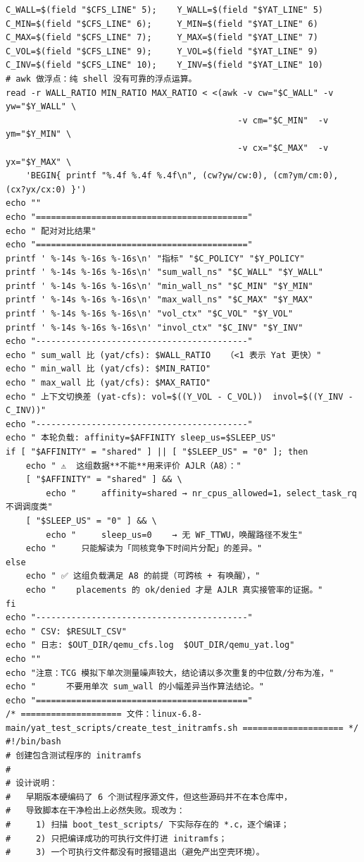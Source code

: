 \documentclass[10pt,a4paper]{article}
\newenvironment{yatpage}{\vspace*{0pt}}{\par}
\begin{document}
\newpage
\begin{yatpage}
\begin{Verbatim}[fontsize=\fontsize{8.2}{9.8}\selectfont]
C_WALL=$(field "$CFS_LINE" 5);    Y_WALL=$(field "$YAT_LINE" 5)
C_MIN=$(field "$CFS_LINE" 6);     Y_MIN=$(field "$YAT_LINE" 6)
C_MAX=$(field "$CFS_LINE" 7);     Y_MAX=$(field "$YAT_LINE" 7)
C_VOL=$(field "$CFS_LINE" 9);     Y_VOL=$(field "$YAT_LINE" 9)
C_INV=$(field "$CFS_LINE" 10);    Y_INV=$(field "$YAT_LINE" 10)
# awk 做浮点：纯 shell 没有可靠的浮点运算。
read -r WALL_RATIO MIN_RATIO MAX_RATIO < <(awk -v cw="$C_WALL" -v yw="$Y_WALL" \
                                              -v cm="$C_MIN"  -v ym="$Y_MIN" \
                                              -v cx="$C_MAX"  -v yx="$Y_MAX" \
    'BEGIN{ printf "%.4f %.4f %.4f\n", (cw?yw/cw:0), (cm?ym/cm:0), (cx?yx/cx:0) }')
echo ""
echo "=========================================="
echo " 配对对比结果"
echo "=========================================="
printf ' %-14s %-16s %-16s\n' "指标" "$C_POLICY" "$Y_POLICY"
printf ' %-14s %-16s %-16s\n' "sum_wall_ns" "$C_WALL" "$Y_WALL"
printf ' %-14s %-16s %-16s\n' "min_wall_ns" "$C_MIN" "$Y_MIN"
printf ' %-14s %-16s %-16s\n' "max_wall_ns" "$C_MAX" "$Y_MAX"
printf ' %-14s %-16s %-16s\n' "vol_ctx" "$C_VOL" "$Y_VOL"
printf ' %-14s %-16s %-16s\n' "invol_ctx" "$C_INV" "$Y_INV"
echo "------------------------------------------"
echo " sum_wall 比 (yat/cfs): $WALL_RATIO   （<1 表示 Yat 更快）"
echo " min_wall 比 (yat/cfs): $MIN_RATIO"
echo " max_wall 比 (yat/cfs): $MAX_RATIO"
echo " 上下文切换差 (yat-cfs): vol=$((Y_VOL - C_VOL))  invol=$((Y_INV - C_INV))"
echo "------------------------------------------"
echo " 本轮负载: affinity=$AFFINITY sleep_us=$SLEEP_US"
if [ "$AFFINITY" = "shared" ] || [ "$SLEEP_US" = "0" ]; then
    echo " ⚠️  这组数据**不能**用来评价 AJLR（A8）："
    [ "$AFFINITY" = "shared" ] && \
        echo "     affinity=shared → nr_cpus_allowed=1，select_task_rq 不调调度类"
    [ "$SLEEP_US" = "0" ] && \
        echo "     sleep_us=0    → 无 WF_TTWU，唤醒路径不发生"
    echo "     只能解读为「同核竞争下时间片分配」的差异。"
else
    echo " ✅ 这组负载满足 A8 的前提（可跨核 + 有唤醒），"
    echo "    placements 的 ok/denied 才是 AJLR 真实接管率的证据。"
fi
echo "------------------------------------------"
echo " CSV: $RESULT_CSV"
echo " 日志: $OUT_DIR/qemu_cfs.log  $OUT_DIR/qemu_yat.log"
echo ""
echo "注意：TCG 模拟下单次测量噪声较大，结论请以多次重复的中位数/分布为准，"
echo "      不要用单次 sum_wall 的小幅差异当作算法结论。"
echo "=========================================="
/* ==================== 文件：linux-6.8-main/yat_test_scripts/create_test_initramfs.sh ==================== */
#!/bin/bash
# 创建包含测试程序的 initramfs
#
# 设计说明：
#   早期版本硬编码了 6 个测试程序源文件，但这些源码并不在本仓库中，
#   导致脚本在干净检出上必然失败。现改为：
#     1) 扫描 boot_test_scripts/ 下实际存在的 *.c，逐个编译；
#     2) 只把编译成功的可执行文件打进 initramfs；
#     3) 一个可执行文件都没有时报错退出（避免产出空壳环境）。
\end{Verbatim}
\end{yatpage}
\end{document}
